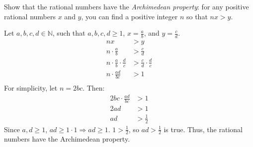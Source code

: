 \documentclass{article}
\begin{document}
\begin{problem}{}{}
    Show that the rational numbers have the \textit{Archimedean property}: for any positive rational numbers $x$ and $y$, you can find a positive integer $n$ so that $nx>y$.
\end{problem}
\begin{solution}{}{}
    Let $a,b,c,d\in\mathbb{N}$, such that $a,b,c,d\geq1$, $x=\frac{a}{b}$, and $y=\frac{c}{d}$.
    \begin{align*}
        nx &> y \\
        n\cdot\frac{a}{b} &> \frac{c}{d} \\
        n\cdot\frac{a}{b}\cdot\frac{d}{c} &> \frac{c}{d}\cdot\frac{d}{c} \\
        n\cdot\frac{ad}{bc} &> 1 \\
    \end{align*}
    For simplicity, let $n=2bc$. Then:
    \begin{align*}
        2bc\cdot\frac{ad}{bc} &> 1 \\
        2ad &> 1 \\
        ad &> \frac{1}{2}
    \end{align*}
    Since $a,d\geq1$, $ad\geq1\cdot1\Rightarrow ad\geq1$. $1>\frac{1}{2}$, so $ad>\frac{1}{2}$ is true. Thus, the rational numbers have the Archimedean property.
\end{solution}
\end{document}
